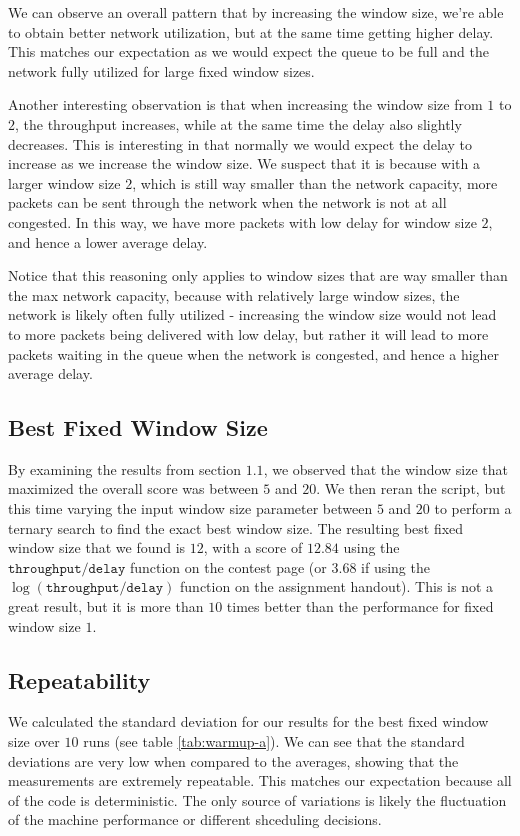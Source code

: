 \documentclass[11pt,a4paper]{article}
\begin{document}
We can observe an overall pattern that by increasing the window size, we're able
to obtain better network utilization, but at the same time getting higher delay.
This matches our expectation as we would expect the queue to be full and the
network fully utilized for large fixed window sizes.

Another interesting observation is that when increasing the window size
from $1$ to $2$, the throughput increases, while at the same time the delay also
slightly decreases. This is interesting in that normally we would expect the
delay to increase as we increase the window size. We suspect that it is because
with a
larger window size $2$, which is still way smaller than the network capacity, more
packets can be sent through the network when the network is not at all
congested. In this way, we have more packets with low delay for window size $2$,
and hence a lower average delay.

Notice that this reasoning only applies
to window sizes that are way smaller than the max network capacity, because with
relatively large window sizes, the network is likely often fully utilized -
increasing the window size would not lead to more packets being delivered with
low delay, but rather it will lead to more packets waiting in the queue when the
network is congested, and hence a higher average delay.

\subsection{Best Fixed Window Size}
By examining the
results from section $1.1$, we observed that the window size that maximized the
overall score was between $5$
and $20$. 
We then reran the script, but this time varying the input window size
parameter between $5$ and 
$20$ to perform a ternary search to find the exact best window
size. The resulting best fixed window size that we found is $12$, with a score of
$12.84$ using the $\texttt{throughput}/\texttt{delay}$ function on the contest page (or
$3.68$ if using the $\log(\texttt{throughput}/\texttt{delay})$  function on the assignment
handout).
This is not a great result, but it is more than $10$ times better than
the performance for fixed window size $1$.

\subsection{Repeatability}

We calculated the standard deviation for our results for the best fixed window
size over $10$ runs (see table \ref{tab:warmup-a}). We can see that the standard
deviations are very low when compared to the averages, showing that the
measurements are extremely repeatable. This matches our expectation because
all of the code is deterministic. The only source of variations is likely the
fluctuation of the machine performance or different shceduling decisions.
\end{document}
